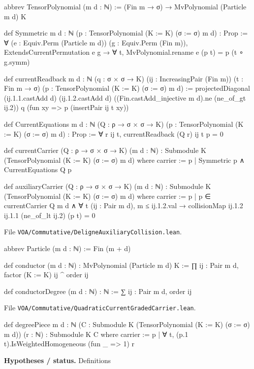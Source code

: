 \documentclass[11pt,openany]{book}
\newcommand{\leanpath}[1]{\texttt{\small #1}}
\theoremstyle{definition}
\theoremstyle{plain}
\begin{document}
\begin{leancode}
abbrev TensorPolynomial (m d : ℕ) :=
  (Fin m → σ) → MvPolynomial (Particle m d) K

def Symmetric {m d : ℕ} (p : TensorPolynomial (K := K) (σ := σ) m d) : Prop :=
  ∀ (e : Equiv.Perm (Particle m d)) (g : Equiv.Perm (Fin m)),
    ExtendsCurrentPermutation e g → ∀ t,
      MvPolynomial.rename e (p t) = p (t ∘ g.symm)

def currentReadback {m d : ℕ} (q : σ × σ → K)
    (ij : IncreasingPair (Fin m)) (t : Fin m → σ)
    (p : TensorPolynomial (K := K) (σ := σ) m d) :=
  projectedDiagonal (ij.1.1.castAdd d) (ij.1.2.castAdd d)
    ((Fin.castAdd_injective m d).ne (ne_of_gt ij.2)) q
    (fun xy => p (insertPair ij t xy))

def CurrentEquations {m d : ℕ} (Q : ρ → σ × σ → K)
    (p : TensorPolynomial (K := K) (σ := σ) m d) : Prop :=
  ∀ r ij t, currentReadback (Q r) ij t p = 0

def currentCarrier (Q : ρ → σ × σ → K) (m d : ℕ) :
    Submodule K (TensorPolynomial (K := K) (σ := σ) m d) where
  carrier := {p | Symmetric p ∧ CurrentEquations Q p}

def auxiliaryCarrier (Q : ρ → σ × σ → K) (m d : ℕ) :
    Submodule K (TensorPolynomial (K := K) (σ := σ) m d) where
  carrier := {p | p ∈ currentCarrier Q m d ∧
    ∀ t (ij : Pair m d), m ≤ ij.1.2.val →
      collisionMap ij.1.2 ij.1.1 (ne_of_lt ij.2) (p t) = 0}
\end{leancode}
{\raggedright\noindent File \leanpath{VOA/\allowbreak Commutative/\allowbreak DeligneAuxiliaryCollision.lean}.\par}
\begin{leancode}
abbrev Particle (m d : ℕ) := Fin (m + d)

def conductor (m d : ℕ) : MvPolynomial (Particle m d) K :=
  ∏ ij : Pair m d, factor (K := K) ij ^ order ij

def conductorDegree (m d : ℕ) : ℕ := ∑ ij : Pair m d, order ij
\end{leancode}
{\raggedright\noindent File \leanpath{VOA/\allowbreak Commutative/\allowbreak QuadraticCurrentGradedCarrier.lean}.\par}
\begin{leancode}
def degreePiece {m d : ℕ}
    (C : Submodule K (TensorPolynomial (K := K) (σ := σ) m d)) (r : ℕ) :
    Submodule K C where
  carrier := {p | ∀ t, (p.1 t).IsWeightedHomogeneous (fun _ => 1) r}
\end{leancode}
\noindent\textbf{Hypotheses / status.} Definitions\par
\end{document}
